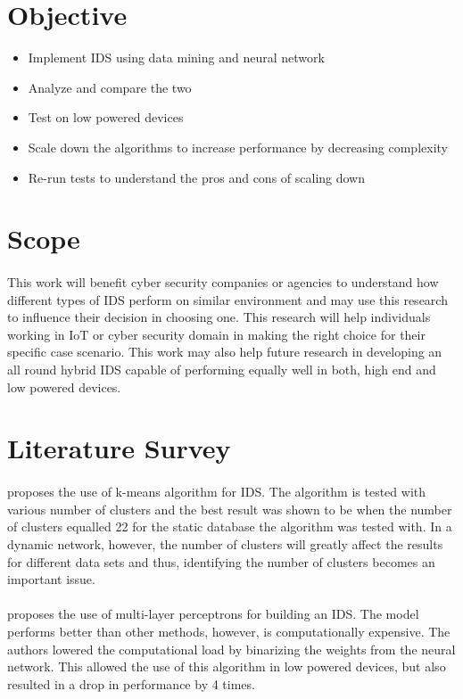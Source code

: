 \documentclass[a4paper,12pt]{article}
\begin{document}
	\section{Objective}
	\begin{itemize}
		\item Implement IDS using data mining and neural network
		\item Analyze and compare the two
		\item Test on low powered devices
		\item Scale down the algorithms to increase performance by decreasing complexity
		\item Re-run tests to understand the pros and cons of scaling down
	\end{itemize}
	\section{Scope}
	\paragraph{}
	This work will benefit cyber security companies or agencies to understand how different types of IDS perform on similar environment and may use this research to influence their decision in choosing one. This research will help individuals working in IoT or cyber security domain in making the right choice for their specific case scenario. This work may also help future research in developing an all round hybrid IDS capable of performing equally well in both, high end and low powered devices. 
	
	\section{Literature Survey}
	\paragraph{}
	\cite{dm15} proposes the use of k-means algorithm for IDS. The algorithm is tested with various number of clusters and the best result was shown to be when the number of clusters equalled 22 for the static database the algorithm was tested with. In a dynamic network, however, the number of clusters will greatly affect the results for different data sets and thus, identifying the number of clusters becomes an important issue.
	\paragraph{}
	\cite{mlp17} proposes the use of multi-layer perceptrons for building an IDS. The model performs better than other methods, however, is computationally expensive. The authors lowered the computational load by binarizing the weights from the neural network. This allowed the use of this algorithm in low powered devices, but also resulted in a drop in performance by 4 times.
\end{document}
